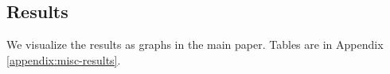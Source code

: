 



\subsection{Results} \label{subsec:results}
\begin{comment}
We first discuss the impact of bit width on the text quality and latency. Then, we show the effectiveness of using multiple colorlists and list decoding. Next, we show how our watermark fares in the presence of corruption. Last, we demonstrate the real-world applicability of MPAC by showing its feasibility in embedding large message ($\geq$ 32 bits).
\end{comment}

We visualize the results as graphs in the main paper. Tables are in Appendix \ref{appendix:misc-results}.
    




